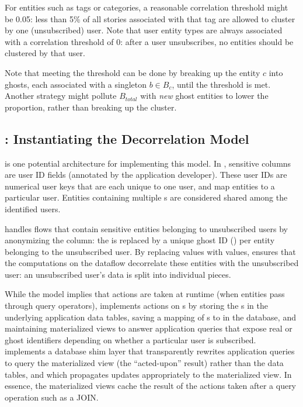 For entities such as tags or categories, a reasonable correlation threshold might be 0.05: less than
5\% of all stories associated with that tag are allowed to cluster by one (unsubscribed) user. Note
that user entity types are always associated with a correlation threshold of 0: after a user
unsubscribes, no entities should be clustered by that user.

Note that meeting the threshold can be done by breaking up the entity $c$ into 
ghosts, each associated with a singleton $b \in B_c$, until the threshold is met. Another strategy
might pollute $B_{total}$ with \emph{new} ghost entities to lower the proportion, rather than
breaking up the cluster. 

\iffalse
\subsection{\sys{}: Instantiating the Decorrelation Model}
\sys{} is one potential architecture for implementing this model. In \sys{}, sensitive columns are
user ID fields (annotated by the application developer).  These user IDs are
numerical user keys \uidkey{} that are each unique to one user, and map entities to a particular
user. Entities containing multiple \uidkey{}s are considered shared among the identified users. 

\sys{} handles flows that contain sensitive entities belonging to unsubscribed users by anonymizing
the \uidkey{} column: the \uidkey{} is replaced by a unique ghost ID
(\gidkey{}) per entity belonging to the unsubscribed user. 
By replacing \uidkey{} values with \gidkey{} values, \sys{} ensures that the
computations on the dataflow decorrelate these entities with the unsubscribed user: an unsubscribed
user's data is split into individual pieces. 

While the model implies that actions are taken at runtime (when entities pass through query
operators), \sys{} implements actions on \uidkey{}s by storing the \gidkey{}s in the underlying
application data tables, saving a mapping of \gidkey{}s to \uidkey{} in the database, and
maintaining materialized views to answer application queries that expose real or ghost identifiers
depending on whether a particular user is subscribed. \sys{} implements a database shim layer that
transparently rewrites application queries to query the materialized view (the ``acted-upon''
result) rather than the data tables, and which propagates updates appropriately to the materialized
view. In essence, the materialized views cache the result of the actions taken after a query
operation such as a JOIN.

